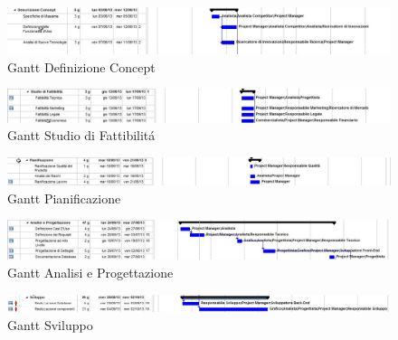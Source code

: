 \begin{figure}[H]
\begin{center}
\includegraphics[width=1\textwidth]{img/G-A Concept.jpg}
\caption{Gantt Definizione Concept}
\label{fig:Gantt Definizione Concept}
\end{center}
\end{figure}

\begin{figure}[H]
\begin{center}
\includegraphics[width=1\textwidth]{img/G-A Fattibilita.jpg}
\caption{Gantt Studio di Fattibilit\'a}
\label{fig:Gantt Studio di Fattibilit\'a}
\end{center}
\end{figure}

\begin{figure}[H]
\begin{center}
\includegraphics[width=1\textwidth]{img/G-A Pianificazione.jpg}
\caption{Gantt Pianificazione}
\label{fig:Gantt Pianificazione}
\end{center}
\end{figure}

\begin{figure}[H]
\begin{center}
\includegraphics[width=1\textwidth]{img/G-A Analisi.jpg}
\caption{Gantt Analisi e Progettazione}
\label{fig:Gantt Analisi e Progettazione}
\end{center}
\end{figure}

\begin{figure}[H]
\begin{center}
\includegraphics[width=1\textwidth]{img/G-A Sviluppo.jpg}
\caption{Gantt Sviluppo}
\label{fig:Gantt Sviluppo}
\end{center}
\end{figure}

